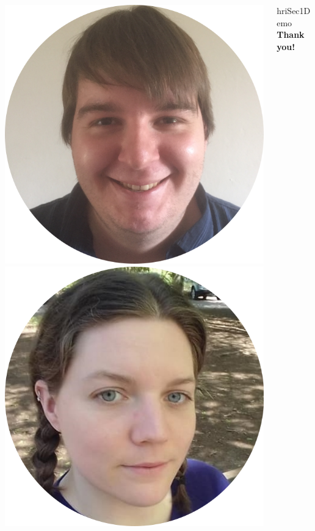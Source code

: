 \documentclass[compress]{beamer}
\makeatletter
\def\beamer@writeslidentry@miniframesoff{%
  \expandafter\beamer@ifempty\expandafter{\beamer@framestartpage}{}%
  {%
    \clearpage\beamer@notesactions%
  }
}
\newcommand*{\miniframesoff}{\let\beamer@writeslidentry=\beamer@writeslidentry@miniframesoff}
\makeatother
\begin{document}
{\begin{frame}[plain]
\begin{columns}
\begin{column}{0.5\linewidth}
        \includegraphics[width=0.3\linewidth]{chris}
        \hspace{0.1cm}
        \includegraphics[width=0.3\linewidth]{maddy}

        \end{column}
        \begin{column}{0.5\linewidth}

    \vspace{6cm}
\begin{beamercolorbox}[wd=\linewidth,ht=6ex,dp=0.7ex]{hriSec1Demo}
    \textbf{Thank you!}

\end{beamercolorbox}
        \end{column}
    \end{columns}
\end{frame}
}


\miniframesoff
\end{document}
